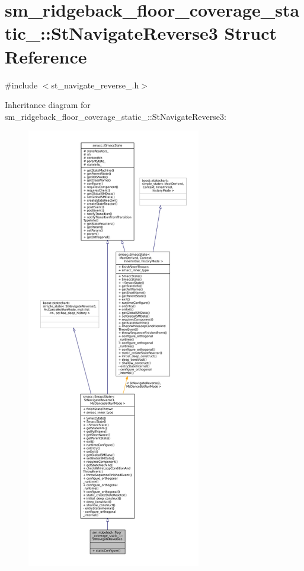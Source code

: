 \hypertarget{structsm__ridgeback__floor__coverage__static__1_1_1StNavigateReverse3}{}\section{sm\+\_\+ridgeback\+\_\+floor\+\_\+coverage\+\_\+static\+\_\+:\+:St\+Navigate\+Reverse3 Struct Reference}
\label{structsm__ridgeback__floor__coverage__static__1_1_1StNavigateReverse3}


{\ttfamily \#include $<$st\+\_\+navigate\+\_\+reverse\+\_.\+h$>$}



Inheritance diagram for sm\+\_\+ridgeback\+\_\+floor\+\_\+coverage\+\_\+static\+\_\+:\+:St\+Navigate\+Reverse3\+:
\nopagebreak
\begin{figure}[H]
\begin{center}
\leavevmode
\includegraphics[height=550pt]{structsm__ridgeback__floor__coverage__static__1_1_1StNavigateReverse3__inherit__graph}
\end{center}
\end{figure}


